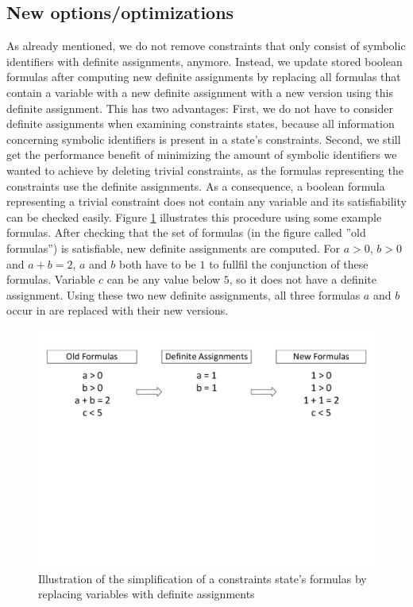 \subsection{New options/optimizations}
\label{sec:newOptions}
 
As already mentioned, we do not remove constraints that only consist of symbolic identifiers with definite assignments, anymore.
Instead, we update stored boolean formulas after computing new definite assignments by replacing all formulas that contain a variable with a new definite assignment
with a new version using this definite assignment.
This has two advantages:
First, we do not have to consider definite assignments when examining constraints states, because all information concerning symbolic identifiers is present in a state's constraints.
Second, we still get the performance benefit of minimizing the amount of symbolic identifiers we wanted to achieve by deleting trivial constraints, as the formulas representing the constraints use the definite assignments. As a consequence, a boolean formula representing a trivial constraint does not contain any variable and its satisfiability can be checked easily.
Figure \ref{fig:formulaReplace} illustrates this procedure using some example formulas.
After checking that the set of formulas (in the figure called ''old formulas'') is satisfiable, new definite assignments are computed. For $a > 0$, $b > 0$ and $a + b = 2$, $a$ and $b$ both have to be $1$ to fullfil the conjunction of these formulas. Variable $c$ can be any value below $5$, so it does not have a definite assignment.
Using these two new definite assignments, all three formulas $a$ and $b$ occur in are replaced with their new versions.

\begin{figure}
\includegraphics[trim=0 350 0 0, clip, width=\textwidth]{implementationCpas/ReplaceFormulaVariablesWithDefAssignments}
\caption{Illustration of the simplification of a constraints state's formulas by replacing variables with definite assignments}
\label{fig:formulaReplace}
\end{figure}

